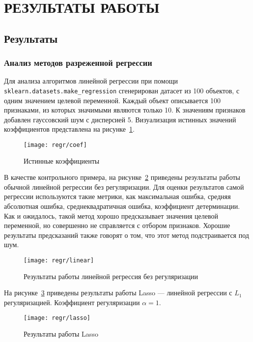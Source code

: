 \section{РЕЗУЛЬТАТЫ РАБОТЫ}

\subsection{Результаты}
\label{section:results}

\subsubsection{Анализ методов разреженной регрессии}

Для анализа алгоритмов линейной регрессии при помощи \texttt{sklearn.datasets.make\_regression} сгенерирован датасет из 100 объектов, с одним значением целевой переменной. Каждый объект описывается 100 признаками, из которых значимыми являются только 10. К значениям признаков добавлен гауссовский шум с дисперсией 5. Визуализация истинных значений коэффициентов представлена на рисунке~\ref{fig:regr:coef}.

\begin{figure}
\texttt{[image: regr/coef]}
\caption{Истинные коэффициенты}
\label{fig:regr:coef}
\end{figure}

В качестве контрольного примера, на рисунке~\ref{fig:regr:linear} приведены результаты работы обычной линейной регрессии без регуляризации. Для оценки результатов самой регрессии используются такие метрики, как максимальная ошибка, средняя абсолютная ошибка, среднеквадратичная ошибка, коэффициент детерминации. Как и ожидалось, такой метод хорошо предсказывает значения целевой переменной, но совершенно не справляется с отбором признаков. Хорошие результаты предсказаний также говорят о том, что этот метод подстраивается под шум.

\begin{figure}
\texttt{[image: regr/linear]}
\caption{Результаты работы линейной регрессия без регуляризации}
\label{fig:regr:linear}
\end{figure}

На рисунке~\ref{fig:regr:lasso} приведены результаты работы Lasso --- линейной регрессии с $L_1$ регуляризацией. Коэффициент регуляризации $\alpha = 1$.

\begin{figure}
\texttt{[image: regr/lasso]}
\caption{Результаты работы Lasso}
\label{fig:regr:lasso}
\end{figure}

